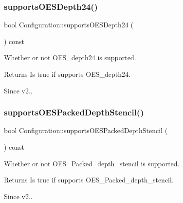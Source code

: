 \subsubsection{\texorpdfstring{supports\+O\+E\+S\+Depth24()}{supportsOESDepth24()}\hspace{0.1cm}{\footnotesize\ttfamily [2/2]}}
{\footnotesize\ttfamily bool Configuration\+::supports\+O\+E\+S\+Depth24 (\begin{DoxyParamCaption}{ }\end{DoxyParamCaption}) const}

Whether or not O\+E\+S\+\_\+depth24 is supported.

\begin{DoxyReturn}{Returns}
Is true if supports O\+E\+S\+\_\+depth24. 
\end{DoxyReturn}
\begin{DoxySince}{Since}
v2.. 
\end{DoxySince}
\mbox{\label{classConfiguration_a8198d85a51e8b33a9171b0087112038d}} 
\subsubsection{\texorpdfstring{supports\+O\+E\+S\+Packed\+Depth\+Stencil()}{supportsOESPackedDepthStencil()}\hspace{0.1cm}{\footnotesize\ttfamily [1/2]}}
{\footnotesize\ttfamily bool Configuration\+::supports\+O\+E\+S\+Packed\+Depth\+Stencil (\begin{DoxyParamCaption}{ }\end{DoxyParamCaption}) const}

Whether or not O\+E\+S\+\_\+\+Packed\+\_\+depth\+\_\+stencil is supported.

\begin{DoxyReturn}{Returns}
Is true if supports O\+E\+S\+\_\+\+Packed\+\_\+depth\+\_\+stencil. 
\end{DoxyReturn}
\begin{DoxySince}{Since}
v2.. 
\end{DoxySince}
\mbox{\label{classConfiguration_a8198d85a51e8b33a9171b0087112038d}} 
